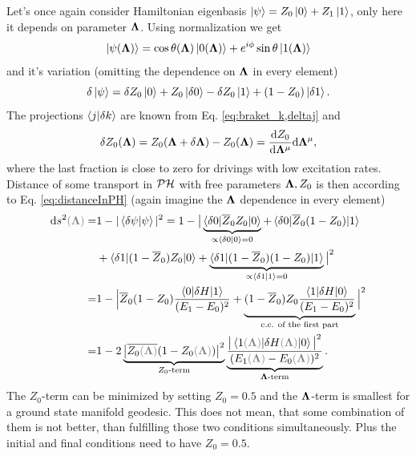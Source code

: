 Let's once again consider Hamiltonian eigenbasis $\ket{\psi}=Z_0\ket{0}+Z_1\ket{1}$, only here it depends on parameter ${\bm\Lambda}$. Using normalization we get
\begin{equation}
    \ket{\psi({\bm\Lambda})}=\cos \theta({\bm\Lambda}) \ket{0({\bm\Lambda})}+e^{i\phi}\sin\theta \ket{1({\bm\Lambda})}
\end{equation}
and it's variation (omitting the dependence on ${\bm\Lambda}$ in every element)
\begin{equation}
    \delta\ket{\psi}=\delta Z_0 \ket{0}+ Z_0 \ket{\delta 0}-\delta Z_0 \ket{1}+ (1-Z_0) \ket{\delta 1}.
    \label{eq:psiVariation}
\end{equation}
The projections $\braket{j|\delta k}$ are known from Eq. \ref{eq:braket_k,deltaj} and 
\begin{equation}
    \delta Z_0({\bm\Lambda})=Z_0({\bm\Lambda}+\delta {\bm\Lambda})-Z_0({\bm\Lambda})=\frac{\mathrm{d} Z_0}{\mathrm{d} {\bm\Lambda}^\mu}\mathrm{d}{\bm\Lambda}^\mu,
\end{equation}
where the last fraction is close to zero for drivings with low excitation rates. Distance of some transport in $\mathcal{PH}$ with free parameters ${\bm\Lambda},Z_0$ is then according to Eq. \ref{eq:distanceInPH} (again imagine the ${\bm\Lambda}$ dependence in every element)
\begin{equation}
    \begin{split}
        \d s^2\textcolor{gray}{(\llambda)} =& 1-|\braket{\delta \psi|\psi}|^2=1-\big|\underbrace{\braket{\delta 0|\overline{Z}_0 Z_0|0}}_{\propto \braket{\delta 0|0}=0}+\braket{\delta 0|\overline{Z}_0(1-Z_0)|1}\\
        &+\braket{\delta 1| (1-\overline{Z}_0)Z_0|0}+\underbrace{\braket{\delta 1|(1-\overline{Z}_0)(1-Z_0)|1}}_{\propto \braket{\delta 1|1}=0}\big|^2\\
        =&1-\Big| \overline{Z}_0(1-Z_0)\frac{\braket{0|\delta H|1}}{(E_1-E_0)^2} +\underbrace{(1-\overline{Z}_0)Z_0\frac{\braket{1|\delta H|0}}{(E_1-E_0)^2}}_{\text{c.c. of the first part}}\Big|^2\\
        =&1-2\underbrace{\big|\overline{Z_0\textcolor{gray}{(\llambda)}}(1-Z_0\textcolor{gray}{(\llambda)})\big|^2}_{Z_0\text{-term}}\underbrace{\frac{\big|\braket{1\textcolor{gray}{(\llambda)}|\delta H\textcolor{gray}{(\llambda)}|0}\big|^2}{(E_1\textcolor{gray}{(\llambda)}-E_0\textcolor{gray}{(\llambda)})^2}}_{\llambda\text{-term}}.
    \end{split}
\end{equation}
The $Z_0$-term can be minimized by setting $Z_0=0.5$ and the ${\bm\Lambda}$-term is smallest for a ground state manifold geodesic. This does not mean, that some combination of them is not better, than fulfilling those two conditions simultaneously. Plus the initial and final conditions need to have $Z_0=0.5$.












